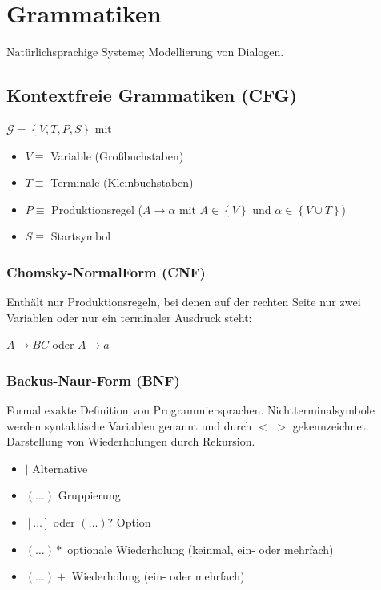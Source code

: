 \documentclass[german,color,6pt]{latex4ei/latex4ei_sheet}
\begin{document}
\columnbreak

\section{Grammatiken}
\begin{symbolbox}
	Natürlichsprachige Systeme; Modellierung von Dialogen.
\end{symbolbox}

\begin{sectionbox}
	\subsection{Kontextfreie Grammatiken (CFG)}
	$ \mathcal G = \left\{ V, T, P, S \right\} $ mit
	\begin{itemize}
		\item $V \equiv$ Variable (Großbuchstaben)
		\item $T \equiv$ Terminale (Kleinbuchstaben)
		\item $P \equiv$ Produktionsregel ($A \rightarrow \alpha $ mit $A \in \left\{V \right\}$ und $\alpha \in \left\{ V \cup T \right\} $)
		\item $S \equiv$ Startsymbol
	\end{itemize}

	\subsubsection{Chomsky-NormalForm (CNF)}
	Enthält nur Produktionsregeln, bei denen auf der rechten Seite nur zwei Variablen oder nur ein terminaler Ausdruck steht:
	\begin{emphbox}
		$A \rightarrow BC$ oder $A \rightarrow a$
	\end{emphbox}

	\subsubsection{Backus-Naur-Form (BNF)}
	Formal exakte Definition von Programmiersprachen. Nichtterminalsymbole werden syntaktische Variablen genannt und durch $<$ $>$ gekennzeichnet. Darstellung von Wiederholungen durch Rekursion.
	\begin{itemize}
		\item $|$ Alternative
		\item $(\dots)$ Gruppierung
		\item $[\dots]$ oder $(\dots)?$ Option
		\item $(\dots)*$ optionale Wiederholung (keinmal, ein- oder mehrfach)
		\item $(\dots)+$ Wiederholung (ein- oder mehrfach)
	\end{itemize}


\end{sectionbox}
\end{document}
